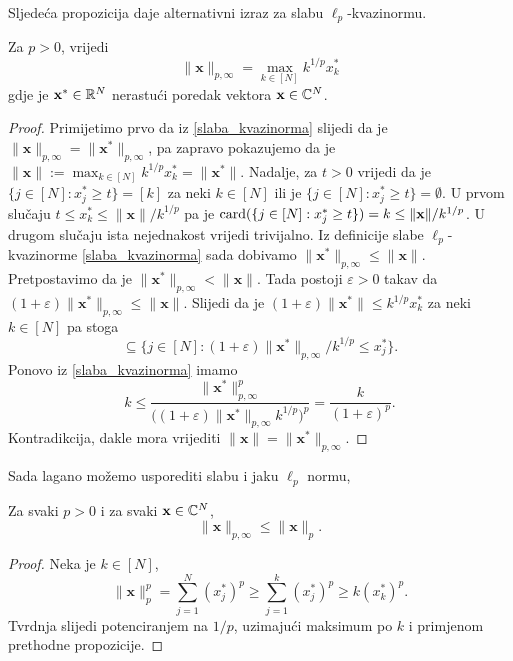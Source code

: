 \documentclass[a4paper,twoside,12pt]{memoir} %
\newcommand{\vect}[1]{\mathbf{#1}}
\renewcommand{\vec}{\vect}
\newcommand{\card}{\text{\normalfont{card}}}
\begin{document}
\noindent Sljede\'ca propozicija daje alternativni izraz za slabu $\ell_p$-kvazinormu.
\begin{prop}\label{slaba_kvazinorma_2}
    Za $p>0$, vrijedi
    \begin{equation*}
        \|\vec{x}\|_{p, \infty} = \max \limits_{k \in [N]}k^{1/p}x_k^{*}
    \end{equation*}
    gdje je $\vec{x}^* \in \R^N$ nerastu\'ci poredak vektora $\vec{x}\in \C^N$.
\end{prop}
\begin{proof}
    Primijetimo prvo da iz \eqref{slaba_kvazinorma} slijedi da je $\|\vec{x}\|_{p, \infty}=\|\vec{x}^*\|_{p, \infty}$, pa zapravo pokazujemo da je $\|\vec{x}\|:= \max_{k \in [N]}k^{1/p}x_k^* = \|\vec{x}^*\|$. Nadalje, za $t>0$ vrijedi da je $\{j \in [N]: x^*_j \geq t\}=[k]$ za neki $k \in [N]$ ili je $\{j \in [N]: x^*_j \geq t\}=\emptyset$. U prvom slu\v{c}aju $t \leq x^*_k \leq \|\vec{x}\|/k^{1/p}$ pa je $\card(\{j \in [N]:x_j^* \geq t \}) = k \leq \|\vec{x}\|/k^{1/p}$. U drugom slu\v{c}aju ista nejednakost vrijedi trivijalno. Iz definicije slabe $\ell_p$-kvazinorme \eqref{slaba_kvazinorma} sada dobivamo $\|\vec{x}^*\|_{p, \infty} \leq \|\vec{x}\|$. Pretpostavimo da je $\|\vec{x}^*\|_{p, \infty} < \|\vec{x}\|$. Tada postoji $\varepsilon > 0$ takav da $(1+ \varepsilon)\|\vec{x}^*\|_{p, \infty} \leq \|\vec{x}\|$. Slijedi da je $(1 + \varepsilon)\|\vec{x}^*\| \leq  k^{1/p}x^*_k$ za neki $k \in [N]$ pa stoga
    \begin{equation*}
        [k] \subseteq \big\{ j \in [N] : (1 + \varepsilon)\|\vec{x}^*\|_{p, \infty}/k^{1/p} \leq x_j^* \big\}.
    \end{equation*}
    Ponovo iz \eqref{slaba_kvazinorma} imamo
    \begin{equation*}
        k \leq \frac{\|\vec{x}^*\|^p_{p, \infty}}{\big( (1 + \varepsilon)\|\vec{x}^*\|_{p, \infty}k^{1/p}\big)^p}=\frac{k}{(1 + \varepsilon)^p}.
    \end{equation*}
    Kontradikcija, dakle mora vrijediti $\|\vec{x}\| = \|\vec{x}^*\|_{p, \infty}$.
\end{proof}
\noindent Sada lagano mo\v{z}emo usporediti slabu i jaku $\ell_p$ normu,
\begin{prop}
    Za svaki $p > 0$ i za svaki $\vec{x} \in \C^N$,
    \begin{equation*}
        \|\vec{x}\|_{p, \infty} \leq \|\vec{x}\|_p.
    \end{equation*}
\end{prop}
\begin{proof}
    Neka je $k \in [N]$,
    \begin{equation*}
        \|\vec{x}\|_p^p = \sum_{j=1}^{N}(x_j^*)^p \geq \sum_{j=1}^{k}(x_j^*)^p \geq k(x_k^*)^p.
    \end{equation*}
    Tvrdnja slijedi potenciranjem na $1/p$, uzimaju\'ci maksimum po $k$ i primjenom prethodne propozicije.
\end{proof}
\end{document}
